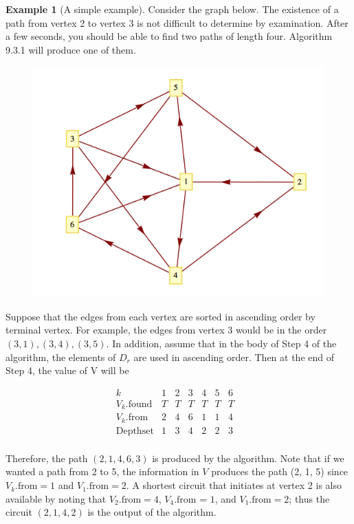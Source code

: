 \documentclass[10pt,]{book}
\theoremstyle{plain}
\theoremstyle{definition}
\theoremstyle{definition}
\theoremstyle{definition}
\newtheorem{example}[theorem]{Example}
\theoremstyle{definition}
\theoremstyle{definition}
\numberwithin{equation}{section}
\begin{document}
\begin{example}[A simple example]\label{ex-search-example}
 Consider the graph below. The existence of a path from vertex 2 to vertex 3 is not difficult to determine by examination.
After a few seconds, you should be able to find two paths of length four. Algorithm 9.3.1 will produce one of them.%
\leavevmode%
\begin{figure}
\centering
\includegraphics[width=1\linewidth]{images/fig-example-9-3-1.png}
\end{figure}
\par
Suppose that the edges from each vertex are sorted in ascending order by terminal vertex. For example, the edges from vertex 3 would be in the order
\((3, 1), (3, 4), (3, 5)\). In addition, assume that in the body of Step 4 of the algorithm, the elements of \(D_r\) are used in ascending order.  Then at the end of Step 4, the value of V will be

 \[\begin{array}{cccccccc}
 k & 1 & 2 & 3 & 4 & 5 & 6 &   \\
 V_k.\text{found} & T & T & T & T & T & T &   \\
 V_k.\text{from} & 2 & 4 & 6 & 1 & 1 & 4 &   \\
 \text{Depth} \text{set} & 1 & 3 & 4 & 2 & 2 & 3 & \\
\end{array}\]

Therefore, the path \((2, 1, 4, 6, 3)\) is produced by the algorithm. Note that if we wanted a path from 2 to 5, the information in \(V\) produces
the path (2, 1, 5) since \(V_k.\text{from} = 1\) and \(V_1.\text{from} = 2\). A shortest circuit that initiates at vertex 2 is also available
by noting that \(V_2.\text{from}=4\), \(V_4\text{.from = 1}\), and \(V_1.\text{from} = 2\); thus the circuit \((2, 1, 4, 2)\) is the output of the algorithm.
%
\end{example}
\typeout{************************************************}
\typeout{************************************************}
\end{document}
